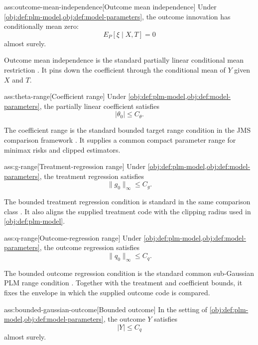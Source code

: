 \documentclass[11pt]{article}
\begin{document}
\begin{assumptionv}{ass:outcome-mean-independence}[Outcome mean independence]
Under \cref{obj:def:plm-model,obj:def:model-parameters}, the outcome innovation has conditionally mean zero:
\[
E_P[\xi \mid X,T]=0
\]
almost surely.
\end{assumptionv}

Outcome mean independence is the standard partially linear conditional mean restriction \citep{Robinson1988}. It pins down the coefficient through the conditional mean of \(Y\) given \(X\) and \(T\).

\begin{assumptionv}{ass:theta-range}[Coefficient range]
Under \cref{obj:def:plm-model,obj:def:model-parameters}, the partially linear coefficient satisfies
\[
|\theta_0|\le C_{\theta}.
\]
\end{assumptionv}

The coefficient range is the standard bounded target range condition in the JMS comparison framework \citep{JinMackeySyrgkanis2025}. It supplies a common compact parameter range for minimax risks and clipped estimators.

\begin{assumptionv}{ass:g-range}[Treatment-regression range]
Under \cref{obj:def:plm-model,obj:def:model-parameters}, the treatment regression satisfies
\[
\|g_0\|_{\infty}\le C_g .
\]
\end{assumptionv}

The bounded treatment regression condition is standard in the same comparison class \citep{JinMackeySyrgkanis2025}. It also aligns the supplied treatment code with the clipping radius used in \cref{obj:def:plm-model}.

\begin{assumptionv}{ass:q-range}[Outcome-regression range]
Under \cref{obj:def:plm-model,obj:def:model-parameters}, the outcome regression satisfies
\[
\|q_0\|_{\infty}\le C_q .
\]
\end{assumptionv}

The bounded outcome regression condition is the standard common sub-Gaussian PLM range condition \citep{JinMackeySyrgkanis2025}. Together with the treatment and coefficient bounds, it fixes the envelope in which the supplied outcome code is compared.

\begin{assumptionv}{ass:bounded-gaussian-outcome}[Bounded outcome]
In the setting of \cref{obj:def:plm-model,obj:def:model-parameters}, the outcome \(Y\) satisfies
\[
|Y|\le C_q
\]
almost surely.
\end{assumptionv}
\end{document}
